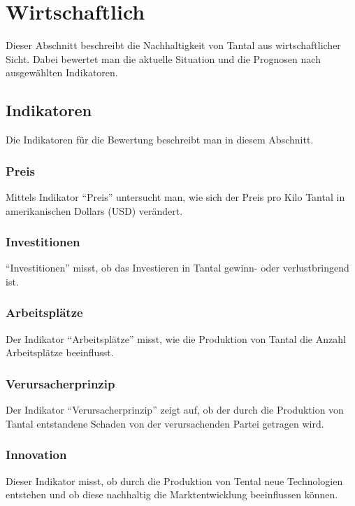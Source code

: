 \section{Wirtschaftlich}\label{sec:conflict}
Dieser Abschnitt beschreibt die Nachhaltigkeit von Tantal aus wirtschaftlicher
Sicht. Dabei bewertet man die aktuelle Situation und die Prognosen nach
ausgewählten Indikatoren.

\subsection{Indikatoren}
Die Indikatoren für die Bewertung beschreibt man in diesem Abschnitt.

\subsubsection{Preis}
Mittels Indikator ``Preis'' untersucht man, wie sich der Preis pro Kilo Tantal
in amerikanischen Dollars (USD) verändert.

\subsubsection{Investitionen}
``Investitionen'' misst, ob das Investieren in Tantal gewinn- oder
verlustbringend ist.

\subsubsection{Arbeitsplätze}
Der Indikator ``Arbeitsplätze'' misst, wie die Produktion von Tantal die Anzahl
Arbeitsplätze beeinflusst.

\subsubsection{Verursacherprinzip}
Der Indikator ``Verursacherprinzip'' zeigt auf, ob der durch die Produktion von
Tantal entstandene Schaden von der verursachenden Partei getragen wird.

\subsubsection{Innovation}
Dieser Indikator misst, ob durch die Produktion von Tental neue Technologien
entstehen und ob diese nachhaltig die Marktentwicklung beeinflussen können.

